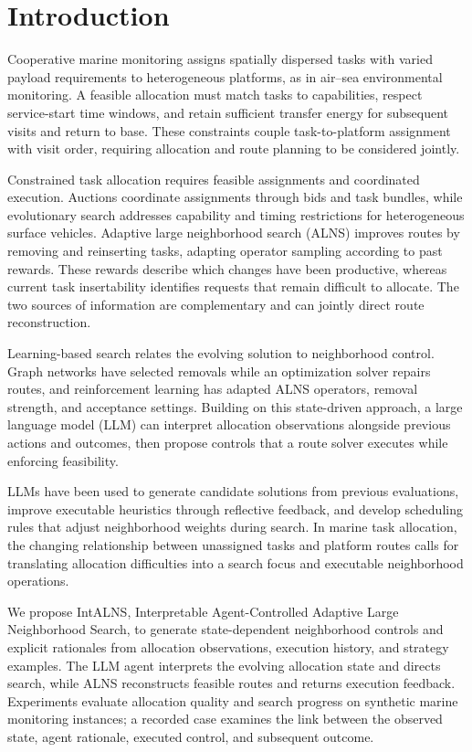 \section{Introduction}
\label{sec:intro}
Cooperative marine monitoring assigns spatially dispersed tasks with varied payload requirements to heterogeneous platforms, as in air--sea environmental monitoring.\cite{bi2024} A feasible allocation must match tasks to capabilities, respect service-start time windows, and retain sufficient transfer energy for subsequent visits and return to base. These constraints couple task-to-platform assignment with visit order, requiring allocation and route planning to be considered jointly.\cite{liu2018}

Constrained task allocation requires feasible assignments and coordinated execution.\cite{nunes2017} Auctions coordinate assignments through bids and task bundles,\cite{choi2009} while evolutionary search addresses capability and timing restrictions for heterogeneous surface vehicles.\cite{wang2024} Adaptive large neighborhood search (ALNS) improves routes by removing and reinserting tasks, adapting operator sampling according to past rewards.\cite{ropke2006} These rewards describe which changes have been productive, whereas current task insertability identifies requests that remain difficult to allocate. The two sources of information are complementary and can jointly direct route reconstruction.

Learning-based search relates the evolving solution to neighborhood control. Graph networks have selected removals while an optimization solver repairs routes,\cite{zhou2023} and reinforcement learning has adapted ALNS operators, removal strength, and acceptance settings.\cite{reijnen2024} Building on this state-driven approach, a large language model (LLM) can interpret allocation observations alongside previous actions and outcomes, then propose controls that a route solver executes while enforcing feasibility.

LLMs have been used to generate candidate solutions from previous evaluations,\cite{opro2024} improve executable heuristics through reflective feedback,\cite{reevo2024} and develop scheduling rules that adjust neighborhood weights during search.\cite{ns4s2025} In marine task allocation, the changing relationship between unassigned tasks and platform routes calls for translating allocation difficulties into a search focus and executable neighborhood operations.

We propose IntALNS, Interpretable Agent-Controlled Adaptive Large Neighborhood Search, to generate state-dependent neighborhood controls and explicit rationales from allocation observations, execution history, and strategy examples. The LLM agent interprets the evolving allocation state and directs search, while ALNS reconstructs feasible routes and returns execution feedback. Experiments evaluate allocation quality and search progress on synthetic marine monitoring instances; a recorded case examines the link between the observed state, agent rationale, executed control, and subsequent outcome.
